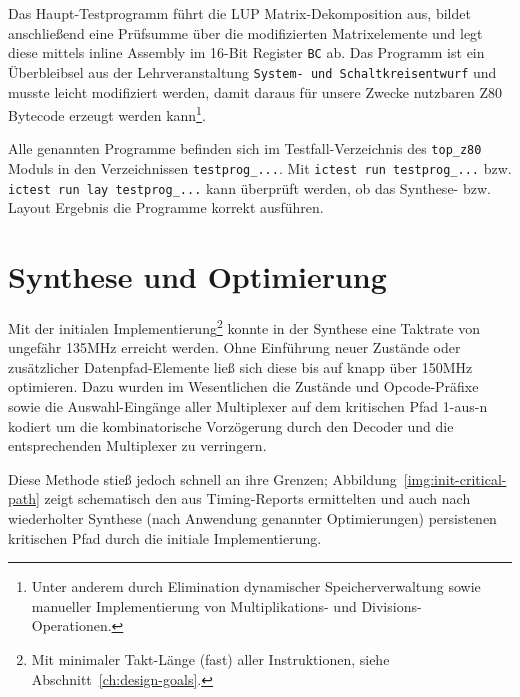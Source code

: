 \documentclass[ngerman, cd=lightcolor]{tudscrreprt}
\begin{document}
Das Haupt-Testprogramm führt die LUP Matrix-Dekomposition aus, bildet
anschließend eine Prüfsumme über die modifizierten Matrixelemente und legt
diese mittels inline Assembly im 16-Bit Register \texttt{BC} ab. Das Programm
ist ein Überbleibsel aus der Lehrveranstaltung \texttt{System- und
Schaltkreisentwurf} und musste leicht modifiziert werden, damit daraus für
unsere Zwecke nutzbaren Z80 Bytecode erzeugt werden kann\footnote{Unter anderem
durch Elimination dynamischer Speicherverwaltung sowie manueller
Implementierung von Multiplikations- und Divisions-Operationen.}.

Alle genannten Programme befinden sich im Testfall-Verzeichnis des
\texttt{top\_z80} Moduls in den Verzeichnissen \texttt{testprog\_...}. Mit
\texttt{ictest run testprog\_...} bzw. \texttt{ictest run lay testprog\_...}
kann überprüft werden, ob das Synthese- bzw. Layout Ergebnis die Programme
korrekt ausführen.

\chapter{Synthese und Optimierung\label{ch:syn}}

Mit der initialen Implementierung\footnote{Mit minimaler Takt-Länge (fast)
aller Instruktionen, siehe Abschnitt~\ref{ch:design-goals}.} konnte in der
Synthese eine Taktrate von ungefähr 135MHz erreicht werden. Ohne Einführung
neuer Zustände oder zusätzlicher Datenpfad-Elemente ließ sich diese bis auf
knapp über 150MHz optimieren. Dazu wurden im Wesentlichen die Zustände und
Opcode-Präfixe sowie die Auswahl-Eingänge aller Multiplexer auf dem kritischen
Pfad 1-aus-n kodiert um die kombinatorische Vorzögerung durch den Decoder und
die entsprechenden Multiplexer zu verringern.

Diese Methode stieß jedoch schnell an ihre Grenzen;
Abbildung~\ref{img:init-critical-path} zeigt schematisch den aus Timing-Reports
ermittelten und auch nach wiederholter Synthese (nach Anwendung genannter
Optimierungen) persistenen kritischen Pfad durch die initiale Implementierung.
\end{document}
